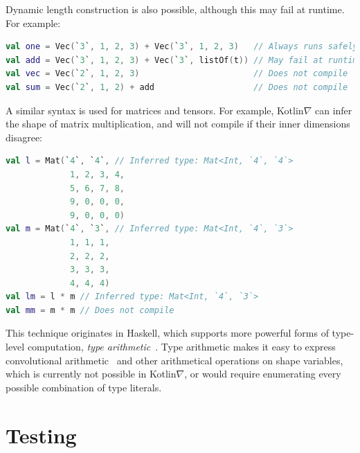 \documentclass[12pt,initial,twoside,maitrise]{dms}
\numberwithin{equation}{section}
\numberwithin{table}{chapter}
\numberwithin{figure}{chapter}
\begin{document}
%
Dynamic length construction is also possible, although this may fail at runtime. For example:
%
\begin{lstlisting}[language=Kotlin]
val one = Vec(`3`, 1, 2, 3) + Vec(`3`, 1, 2, 3)   // Always runs safely
val add = Vec(`3`, 1, 2, 3) + Vec(`3`, listOf(t)) // May fail at runtime
val vec = Vec(`2`, 1, 2, 3)                       // Does not compile
val sum = Vec(`2`, 1, 2) + add                    // Does not compile
\end{lstlisting}
%
A similar syntax is used for matrices and tensors. For example, Kotlin$\nabla$ can infer the shape of matrix multiplication, and will not compile if their inner dimensions disagree:
%
\begin{lstlisting}[language=Kotlin]
val l = Mat(`4`, `4`, // Inferred type: Mat<Int, `4`, `4`>
             1, 2, 3, 4,
             5, 6, 7, 8,
             9, 0, 0, 0,
             9, 0, 0, 0)
val m = Mat(`4`, `3`, // Inferred type: Mat<Int, `4`, `3`>
             1, 1, 1,
             2, 2, 2,
             3, 3, 3,
             4, 4, 4)
val lm = l * m // Inferred type: Mat<Int, `4`, `3`>
val mm = m * m // Does not compile
\end{lstlisting}
%
This technique originates in Haskell, which supports more powerful forms of type-level computation, \textit{type arithmetic}~\cite{kiselyov2005number}. Type arithmetic makes it easy to express convolutional arithmetic~\cite{dumoulin2016guide} and other arithmetical operations on shape variables, which is currently not possible in Kotlin$\nabla$, or would require enumerating every possible combination of type literals.

\section{Testing}\label{sec:testing}
\end{document}
